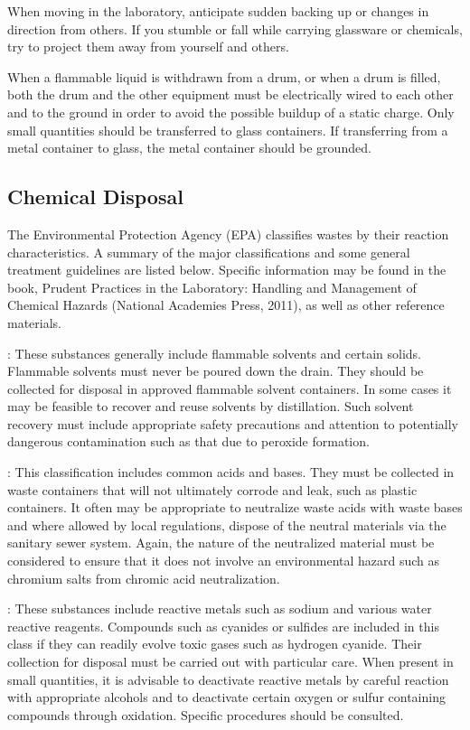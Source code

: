 \documentclass[letterpaper,10pt,english]{sphinxmanual}
\begin{document}
When moving in the laboratory, anticipate sudden backing up or changes in direction from others. If you stumble or fall while carrying glassware or chemicals, try to project them away from yourself and others.

When a flammable liquid is withdrawn from a drum, or when a drum is filled, both the drum and the other equipment must be electrically wired to each other and to the ground in order to avoid the possible buildup of a static charge. Only small quantities should be transferred to glass containers. If transferring from a metal container to glass, the metal container should be grounded.


\subsection{Chemical Disposal}
\label{\detokenize{Laboratory_Safety/Laboratory_Safety:chemical-disposal}}
The Environmental Protection Agency (EPA) classifies wastes by their reaction characteristics. A summary of the major classifications and some general treatment guidelines are listed below. Specific information may be found in the book, Prudent Practices in the Laboratory: Handling and Management of Chemical Hazards (National Academies Press, 2011), as well as other reference materials.

: These substances generally include flammable solvents and certain solids. Flammable solvents must never be poured down the drain. They should be collected for disposal in approved flammable solvent containers. In some cases it may be feasible to recover and reuse solvents by distillation. Such solvent recovery must include appropriate safety precautions and attention to potentially dangerous contamination such as that due to peroxide formation.

: This classification includes common acids and bases. They must be collected in waste containers that will not ultimately corrode and leak, such as plastic containers. It often may be appropriate to neutralize waste acids with waste bases and where allowed by local regulations, dispose of the neutral materials via the sanitary sewer system. Again, the nature of the neutralized material must be considered to ensure that it does not involve an environmental hazard such as chromium salts from chromic acid neutralization.

: These substances include reactive metals such as sodium and various water reactive reagents. Compounds such as cyanides or sulfides are included in this class if they can readily evolve toxic gases such as hydrogen cyanide. Their collection for disposal must be carried out with particular care. When present in small quantities, it is advisable to deactivate reactive metals by careful reaction with appropriate alcohols and to deactivate certain oxygen or sulfur containing compounds through oxidation. Specific procedures should be consulted.
\end{document}
